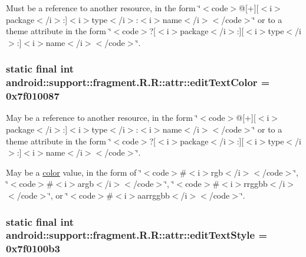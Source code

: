 Must be a reference to another resource, in the form \char`\"{}$<$code$>$@\mbox{[}+\mbox{]}\mbox{[}$<$i$>$package$<$/i$>$:\mbox{]}$<$i$>$type$<$/i$>$:$<$i$>$name$<$/i$>$$<$/code$>$\char`\"{} or to a theme attribute in the form \char`\"{}$<$code$>$?\mbox{[}$<$i$>$package$<$/i$>$:\mbox{]}\mbox{[}$<$i$>$type$<$/i$>$:\mbox{]}$<$i$>$name$<$/i$>$$<$/code$>$\char`\"{}. \hypertarget{classandroid_1_1support_1_1fragment_1_1_r_1_1attr_0b87ef8f368b260cdc4ee1518735b5ba}{
\subsubsection[{editTextColor}]{\setlength{\rightskip}{0pt plus 5cm}static final int android::support::fragment.R.R::attr::editTextColor = 0x7f010087}}
\label{classandroid_1_1support_1_1fragment_1_1_r_1_1attr_0b87ef8f368b260cdc4ee1518735b5ba}


May be a reference to another resource, in the form \char`\"{}$<$code$>$@\mbox{[}+\mbox{]}\mbox{[}$<$i$>$package$<$/i$>$:\mbox{]}$<$i$>$type$<$/i$>$:$<$i$>$name$<$/i$>$$<$/code$>$\char`\"{} or to a theme attribute in the form \char`\"{}$<$code$>$?\mbox{[}$<$i$>$package$<$/i$>$:\mbox{]}\mbox{[}$<$i$>$type$<$/i$>$:\mbox{]}$<$i$>$name$<$/i$>$$<$/code$>$\char`\"{}. 

May be a \hyperlink{classandroid_1_1support_1_1fragment_1_1_r_1_1color}{color} value, in the form of \char`\"{}$<$code$>$\#$<$i$>$rgb$<$/i$>$$<$/code$>$\char`\"{}, \char`\"{}$<$code$>$\#$<$i$>$argb$<$/i$>$$<$/code$>$\char`\"{}, \char`\"{}$<$code$>$\#$<$i$>$rrggbb$<$/i$>$$<$/code$>$\char`\"{}, or \char`\"{}$<$code$>$\#$<$i$>$aarrggbb$<$/i$>$$<$/code$>$\char`\"{}. \hypertarget{classandroid_1_1support_1_1fragment_1_1_r_1_1attr_3bafd464e3ffdcc0f1d44f97d1b74fc0}{
\subsubsection[{editTextStyle}]{\setlength{\rightskip}{0pt plus 5cm}static final int android::support::fragment.R.R::attr::editTextStyle = 0x7f0100b3}}
\label{classandroid_1_1support_1_1fragment_1_1_r_1_1attr_3bafd464e3ffdcc0f1d44f97d1b74fc0}


